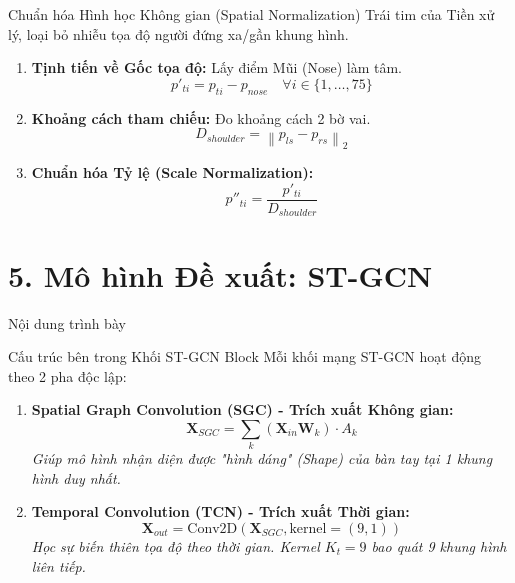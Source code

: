 \documentclass[aspectratio=169]{beamer}
\begin{document}
\begin{frame}{Chuẩn hóa Hình học Không gian (Spatial Normalization)}
    Trái tim của Tiền xử lý, loại bỏ nhiễu tọa độ người đứng xa/gần khung hình.
    \vspace{0.1cm}
    \begin{enumerate}
        \item \textbf{Tịnh tiến về Gốc tọa độ:} Lấy điểm Mũi (Nose) làm tâm.
        \vspace{-0.2cm}
        \[ p'_{ti} = p_{ti} - p_{nose} \quad \forall i \in \{1, \dots, 75\} \]
        \item \textbf{Khoảng cách tham chiếu:} Đo khoảng cách 2 bờ vai.
        \vspace{-0.2cm}
        \[ D_{shoulder} = \left\| p_{ls} - p_{rs} \right\|_2 \]
        \item \textbf{Chuẩn hóa Tỷ lệ (Scale Normalization):}
        \vspace{-0.2cm}
        \[ p''_{ti} = \frac{p'_{ti}}{D_{shoulder}} \]
    \end{enumerate}
\end{frame}

\section{5. Mô hình Đề xuất: ST-GCN}
\begin{frame}{Nội dung trình bày}
\end{frame}

\begin{frame}{Cấu trúc bên trong Khối ST-GCN Block}
    Mỗi khối mạng ST-GCN hoạt động theo 2 pha độc lập:
    \vspace{0.2cm}
    \begin{enumerate}
        \item \textbf{Spatial Graph Convolution (SGC) - Trích xuất Không gian:}
        \[ \mathbf{X}_{SGC} = \sum_{k} ( \mathbf{X}_{in} \mathbf{W}_k ) \cdot A_{k} \]
        \textit{Giúp mô hình nhận diện được "hình dáng" (Shape) của bàn tay tại 1 khung hình duy nhất.}
        
        \vspace{0.3cm}
        \item \textbf{Temporal Convolution (TCN) - Trích xuất Thời gian:}
        \[ \mathbf{X}_{out} = \text{Conv2D}(\mathbf{X}_{SGC}, \text{kernel}=(9, 1)) \]
        \textit{Học sự biến thiên tọa độ theo thời gian. Kernel $K_t=9$ bao quát 9 khung hình liên tiếp.}
    \end{enumerate}
\end{frame}
\end{document}

